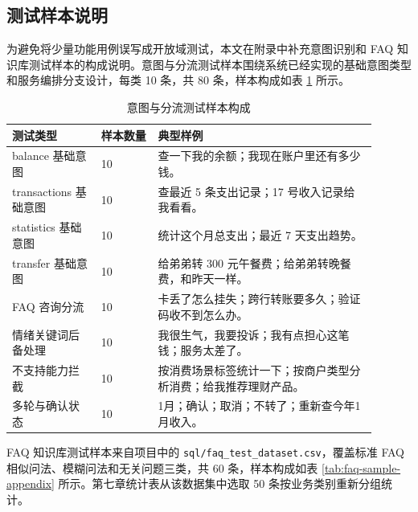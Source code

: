 \documentclass[bachelor, print]{xduthesis}
\begin{document}
\begin{appendix}
\section{测试样本说明}
\label{app:test-samples}

为避免将少量功能用例误写成开放域测试，本文在附录中补充意图识别和 FAQ 知识库测试样本的构成说明。意图与分流测试样本围绕系统已经实现的基础意图类型和服务编排分支设计，每类 10 条，共 80 条，样本构成如表 \ref{tab:intent-sample-appendix} 所示。

\begin{table}[H]
    \centering
    \caption{意图与分流测试样本构成}
    \label{tab:intent-sample-appendix}
    \small
    \setlength{\tabcolsep}{4pt}
    \begin{tabular}{|p{0.22\linewidth}|p{0.14\linewidth}|p{0.54\linewidth}|}
        \hline
        测试类型 & 样本数量 & 典型样例 \\
        \hline
        balance 基础意图 & 10 & 查一下我的余额；我现在账户里还有多少钱。 \\
        \hline
        transactions 基础意图 & 10 & 查最近 5 条支出记录；17 号收入记录给我看看。 \\
        \hline
        statistics 基础意图 & 10 & 统计这个月总支出；最近 7 天支出趋势。 \\
        \hline
        transfer 基础意图 & 10 & 给弟弟转 300 元午餐费；给弟弟转晚餐费，和昨天一样。 \\
        \hline
        FAQ 咨询分流 & 10 & 卡丢了怎么挂失；跨行转账要多久；验证码收不到怎么办。 \\
        \hline
        情绪关键词后备处理 & 10 & 我很生气，我要投诉；我有点担心这笔钱；服务太差了。 \\
        \hline
        不支持能力拦截 & 10 & 按消费场景标签统计一下；按商户类型分析消费；给我推荐理财产品。 \\
        \hline
        多轮与确认状态 & 10 & 1月；确认；取消；不转了；重新查今年1月收入。 \\
        \hline
    \end{tabular}
\end{table}

FAQ 知识库测试样本来自项目中的 \texttt{sql/faq\_test\_dataset.csv}，覆盖标准 FAQ 相似问法、模糊问法和无关问题三类，共 60 条，样本构成如表 \ref{tab:faq-sample-appendix} 所示。第七章统计表从该数据集中选取 50 条按业务类别重新分组统计。


\end{appendix}
\end{document}
